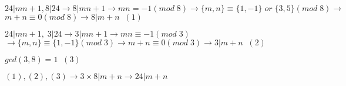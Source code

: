 \p
\begin{flushleft}


 $24|mn+1, 8|24 \rightarrow 8|mn+1 \rightarrow mn=-1(mod \; 8)
 \rightarrow \{ m,n \} \equiv \{ 1,-1 \} \; or \; \{ 3,5 \} (mod \; 8) \rightarrow$
 $ m + n \equiv 0(mod \; 8) \rightarrow 8|m+n \; \; (1)$
 
$24|mn +1, \; 3|24 \rightarrow 3|mn+1 \rightarrow mn \equiv -1(mod \; 3)$
$\rightarrow \{ m,n \} \equiv \{ 1,-1 \} (mod \; 3) \rightarrow m+n \equiv 0(mod \; 3) \rightarrow 3|m+n \; \; (2)$

$gcd(3,8) = 1 \; \; (3)$

$(1),(2),(3) \rightarrow 3\times 8 | m+n \rightarrow 24|m+n$


\end{flushleft}
